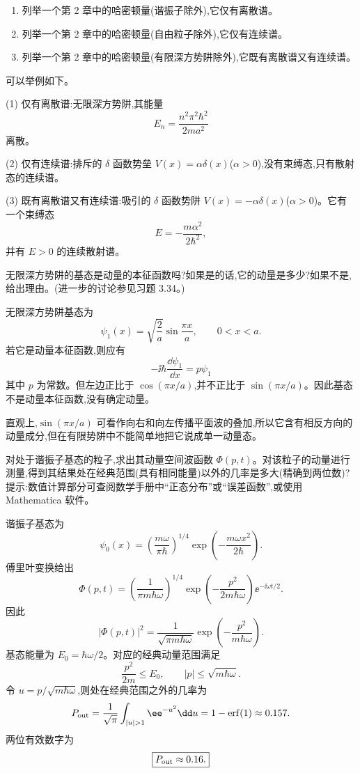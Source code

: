 \begin{question}
\begin{enumerate}
\item 列举一个第 2 章中的哈密顿量(谐振子除外),它仅有离散谱。
\item 列举一个第 2 章中的哈密顿量(自由粒子除外),它仅有连续谱。
\item 列举一个第 2 章中的哈密顿量(有限深方势阱除外),它既有离散谱又有连续谱。
\end{enumerate}
\begin{solution}
可以举例如下。

(1) 仅有离散谱:无限深方势阱,其能量
\[
E_n=\frac{n^2\pi^2\hbar^2}{2ma^2}
\]
离散。

(2) 仅有连续谱:排斥的 $\delta$ 函数势垒 $V(x)=\alpha\delta(x)$($\alpha>0$),没有束缚态,只有散射态的连续谱。

(3) 既有离散谱又有连续谱:吸引的 $\delta$ 函数势阱 $V(x)=-\alpha\delta(x)$($\alpha>0$)。它有一个束缚态
\[
E=-\frac{m\alpha^2}{2\hbar^2},
\]
并有 $E>0$ 的连续散射谱。
\end{solution}
\end{question}

\begin{question}
无限深方势阱的基态是动量的本征函数吗?如果是的话,它的动量是多少?如果不是,给出理由。(进一步的讨论参见习题 3.34。)
\begin{solution}
无限深方势阱基态为
\[
\psi_1(x)=\sqrt{\frac2a}\sin\frac{\pi x}{a},\qquad 0<x<a.
\]
若它是动量本征函数,则应有
\[
-\ii\hbar\frac{\dd\psi_1}{\dd x}=p\psi_1
\]
其中 $p$ 为常数。但左边正比于 $\cos(\pi x/a)$,并不正比于 $\sin(\pi x/a)$。因此基态不是动量本征函数,没有确定动量。

直观上,$\sin(\pi x/a)$ 可看作向右和向左传播平面波的叠加,所以它含有相反方向的动量成分,但在有限势阱中不能简单地把它说成单一动量态。
\end{solution}
\end{question}

\begin{question}
对处于谐振子基态的粒子,求出其动量空间波函数 $\Phi(p,t)$。对该粒子的动量进行测量,得到其结果处在经典范围(具有相同能量)以外的几率是多大(精确到两位数)?提示:数值计算部分可查阅数学手册中“正态分布”或“误差函数”,或使用 Mathematica 软件。
\begin{solution}
谐振子基态为
\[
\psi_0(x)=\left(\frac{m\omega}{\pi\hbar}\right)^{1/4}
\exp\left(-\frac{m\omega x^2}{2\hbar}\right).
\]
傅里叶变换给出
\[
\Phi(p,t)=\left(\frac1{\pi m\hbar\omega}\right)^{1/4}
\exp\left(-\frac{p^2}{2m\hbar\omega}\right)\ee^{-\ii\omega t/2}.
\]
因此
\[
|\Phi(p,t)|^2=\frac1{\sqrt{\pi m\hbar\omega}}
\exp\left(-\frac{p^2}{m\hbar\omega}\right).
\]
基态能量为 $E_0=\hbar\omega/2$。对应的经典动量范围满足
\[
\frac{p^2}{2m}\le E_0,
\qquad |p|\le \sqrt{m\hbar\omega}.
\]
令 $u=p/\sqrt{m\hbar\omega}$,则处在经典范围之外的几率为
\[
P_{\rm out}=\frac1{\sqrt\pi}\int_{|u|>1}\ee^{-u^2}\dd u
=1-\operatorname{erf}(1)\approx 0.157.
\]
两位有效数字为
\[
\boxed{P_{\rm out}\approx 0.16.}
\]
\end{solution}
\end{question}

